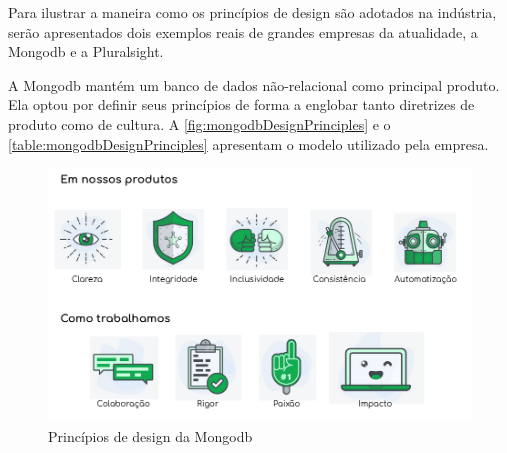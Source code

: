 Para ilustrar a maneira como os princípios de design são adotados na indústria, serão apresentados dois exemplos reais de grandes empresas da atualidade, a Mongodb e a Pluralsight.

A Mongodb mantém um banco de dados não-relacional como principal produto. Ela optou por definir seus princípios de forma a englobar tanto diretrizes de produto como de cultura. A \autoref{fig:mongodbDesignPrinciples} e o \autoref{table:mongodbDesignPrinciples} apresentam o modelo utilizado pela empresa.


\begin{figure}[!htb]
	\centering
	\includegraphics[width=\linewidth]{./04-figuras/02_referencial_teorico/mongodb-design-principles.png}
	\caption{Princípios de design da Mongodb}
  \label{fig:mongodbDesignPrinciples}
\end{figure}

